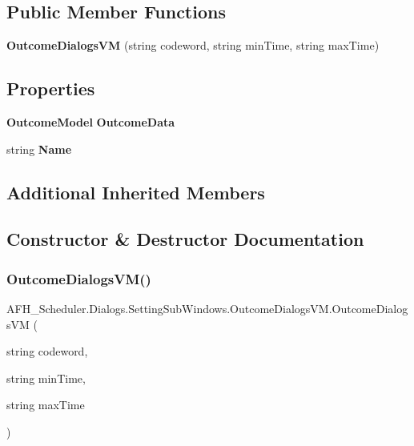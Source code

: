 \subsection*{Public Member Functions}
\begin{DoxyCompactItemize}
\item 
\textbf{ Outcome\+Dialogs\+VM} (string codeword, string min\+Time, string max\+Time)
\end{DoxyCompactItemize}
\subsection*{Properties}
\begin{DoxyCompactItemize}
\item 
\textbf{ Outcome\+Model} \textbf{ Outcome\+Data}\hspace{0.3cm}{\ttfamily  [get, set]}
\item 
string \textbf{ Name}\hspace{0.3cm}{\ttfamily  [get]}
\end{DoxyCompactItemize}
\subsection*{Additional Inherited Members}


\subsection{Constructor \& Destructor Documentation}
\mbox{\label{class_a_f_h___scheduler_1_1_dialogs_1_1_setting_sub_windows_1_1_outcome_dialogs_v_m_a4808294bbebf4af2957e82fbcfa974ad}} 
\subsubsection{OutcomeDialogsVM()}
{\footnotesize\ttfamily A\+F\+H\+\_\+\+Scheduler.\+Dialogs.\+Setting\+Sub\+Windows.\+Outcome\+Dialogs\+V\+M.\+Outcome\+Dialogs\+VM (\begin{DoxyParamCaption}\item[{string}]{codeword,  }\item[{string}]{min\+Time,  }\item[{string}]{max\+Time }\end{DoxyParamCaption})}




